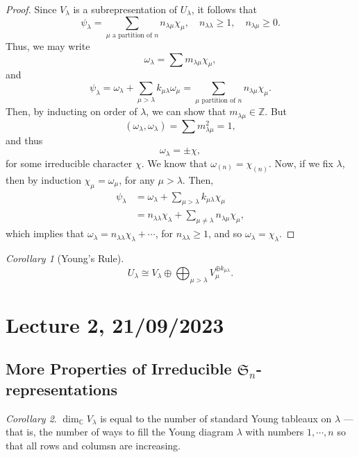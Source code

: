 \documentclass[a4paper]{report}
\theoremstyle{definition}
\theoremstyle{remark}
\theoremstyle{proposition}
\theoremstyle{conjecture}
\theoremstyle{lemma}
\theoremstyle{corollary}
\newtheorem{corollary}{Corollary}
\theoremstyle{exercise}
\theoremstyle{example}
\newcommand{\C}{\mathbb{C}}
\begin{document}
\begin{proof}
    Since $V_\lambda$ is a subrepresentation of $U_\lambda$, it follows
    that $$\psi_\lambda = \sum_{\text{$\mu$ a partition of $n$}} n_{\lambda\mu}\chi_\mu,\quad n_{\lambda\lambda} \geq 1, \quad n_{\lambda\mu}\geq 0.$$
    Thus, we may write $$\omega_\lambda = \sum m_{\lambda\mu}\chi_\mu,$$
    and $$\psi_\lambda = \omega_\lambda + \sum_{\mu > \lambda} k_{\mu\lambda}\omega_\mu = \sum_{\text{$\mu$ partition of $n$}} n_{\lambda\mu}\chi_\mu.$$
    Then, by inducting on order of $\lambda$, we can show that 
    $m_{\lambda\mu}\in\mathbb{Z}$. But 
    $$(\omega_\lambda,\omega_\lambda) = \sum m_{\lambda\mu}^2 = 1,$$
    and thus $$\omega_\lambda = \pm \chi,$$
    for some irreducible character $\chi$.
    We know that 
    $\omega_{(n)} = \chi_{(n)}$. Now, if we fix $\lambda$, then by induction
    $\chi_\mu = \omega_\mu$, for any $\mu > \lambda$. Then, 
    \begin{align*}
        \psi_\lambda &= \omega_\lambda + \sum_{\mu> \lambda}k_{\mu\lambda}\chi_\mu\\
                     &= n_{\lambda\lambda}\chi_\lambda + \sum_{\mu\neq \lambda} n_{\lambda\mu}\chi_\mu,
    \end{align*}
    which implies that 
    $\omega_\lambda  = n_{\lambda\lambda}\chi_\lambda + \cdots$,
    for $n_{\lambda\lambda}\geq 1$, and so $\omega_\lambda = \chi_\lambda$.
\end{proof}

\begin{corollary}[Young's Rule]
    $$U_\lambda \cong V_\lambda \oplus \bigoplus_{\mu>\lambda} V_\mu^{\oplus k_{\mu\lambda}}.$$
\end{corollary}

\section{Lecture 2, 21/09/2023}

\subsection{More Properties of Irreducible $\mathfrak{S}_n$-representations}

\begin{corollary}
    $\dim_\C V_\lambda$ is equal to the number of standard Young tableaux on 
    $\lambda$ --- that is, the number of ways to fill the Young diagram
    $\lambda$ with numbers $1,\cdots,n$ so that all rows and columsn are 
    increasing.
\end{corollary}
\end{document}
